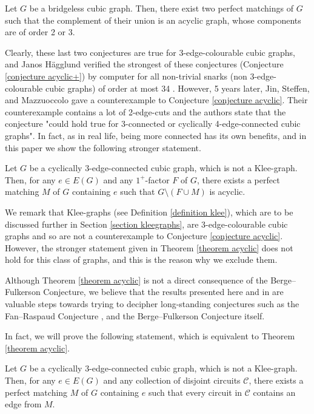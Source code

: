 \documentclass[]{theclass}
\begin{document}
\begin{conjecture}\label{conjecture acyclic+}
Let $G$ be a bridgeless cubic graph. Then, there exist two perfect matchings of $G$ such that the complement of their union is an acyclic graph, whose components are of order 2 or 3.
\end{conjecture}

Clearly, these last two conjectures are true for 3-edge-colourable cubic graphs, and Janos H\"agglund verified the strongest of these conjectures (Conjecture \ref{conjecture acyclic+}) by computer for all non-trivial snarks (non 3-edge-colourable cubic graphs) of order at most 34 \cite{MazzuoccoloS4}. 
However, 5 years later, Jin, Steffen, and Mazzuoccolo \cite{dmgt} gave a counterexample to Conjecture \ref{conjecture acyclic}. Their counterexample contains a lot of 2-edge-cuts and the authors state that the conjecture "could hold true for 3-connected or cyclically 4-edge-connected cubic graphs". In fact, as in real life, being more connected has its own benefits, and in this paper we show the following stronger statement.

\begin{theorem}\label{theorem acyclic}
Let $G$ be a cyclically 3-edge-connected cubic graph, which is not a Klee-graph. Then, for any $e\in E(G)$ and any $1^+$-factor $F$ of $G$, there exists a perfect matching $M$ of $G$ containing $e$ such that $G\setminus (F\cup M)$ is acyclic.
\end{theorem}

We 
remark that Klee-graphs (see Definition \ref{definition klee}), which are to be discussed further in Section \ref{section kleegraphs}, are 3-edge-colourable cubic graphs and so are not a counterexample to Conjecture \ref{conjecture acyclic}. However, the stronger statement given in Theorem \ref{theorem acyclic} does not hold for this class of graphs, and this is the reason why we exclude them. 



Although Theorem \ref{theorem acyclic} is not a direct consequence of the Berge--Fulkerson Conjecture, we believe that the results presented here and in \cite{quelling1} are valuable steps towards trying to decipher long-standing conjectures such as the Fan--Raspaud Conjecture \cite{FanRaspaud}, and the Berge--Fulkerson Conjecture itself.

In fact, we will prove the following statement, which is equivalent to Theorem \ref{theorem acyclic}.
\begin{theorem}\label{theorem acyclic2}
Let $G$ be a cyclically 3-edge-connected cubic graph, which is not a Klee-graph. Then, for any $e\in E(G)$ and any collection of disjoint circuits $\mathcal{C}$, there exists a perfect matching $M$ of $G$ containing $e$ such that every circuit in $\mathcal{C}$ contains an edge from $M$.
\end{theorem}
\end{document}
